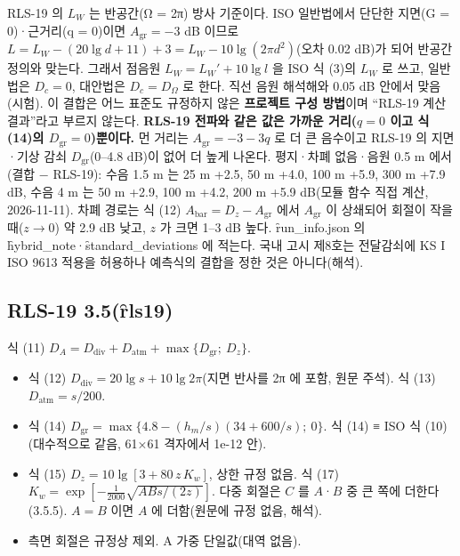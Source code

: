 \documentclass[10.5pt,a4paper]{article}
\begin{document}
 RLS-19 의 $L_W$ 는 반공간(Ω = 2π) 방사 기준이다. ISO 일반법에서 단단한 지면(G = 0)·근거리(q = 0)이면 $A_\mathrm{gr} = -3$ dB 이므로 $L = L_W - (20\lg d + 11) + 3 = L_W - 10\lg(2\pi d^2)$(오차 0.02 dB)가 되어 반공간 정의와 맞는다. 그래서 점음원 $L_W = L_W' + 10\lg l$ 을 ISO 식 (3)의 $L_W$ 로 쓰고, 일반법은 $D_c = 0$, 대안법은 $D_c = D_\Omega$ 로 한다. 직선 음원 해석해와 0.05 dB 안에서 맞음(시험). 이 결합은 어느 표준도 규정하지 않은 \textbf{프로젝트 구성 방법}이며 ``RLS-19 계산 결과''라고 부르지 않는다. \textbf{RLS-19 전파와 같은 값은 가까운 거리($q = 0$ 이고 식 (14)의 $D_\mathrm{gr} = 0$)뿐이다.} 먼 거리는 $A_\mathrm{gr} = -3 - 3q$ 로 더 큰 음수이고 RLS-19 의 지면·기상 감쇠 $D_\mathrm{gr}$(0–4.8 dB)이 없어 더 높게 나온다. 평지·차폐 없음·음원 0.5 m 에서 (결합 − RLS-19): 수음 1.5 m 는 25 m +2.5, 50 m +4.0, 100 m +5.9, 300 m +7.9 dB, 수음 4 m 는 50 m +2.9, 100 m +4.2, 200 m +5.9 dB(모듈 함수 직접 계산, 2026-11-11). 차폐 경로는 식 (12) $A_\mathrm{bar} = D_z - A_\mathrm{gr}$ 에서 $A_\mathrm{gr}$ 이 상쇄되어 회절이 작을 때($z \to 0$) 약 2.9 dB 낮고, $z$ 가 크면 1–3 dB 높다. \f{run\_info.json} 의 \f{hybrid\_note}·\f{standard\_deviations} 에 적는다. 국내 고시 제8호는 전달감쇠에 KS I ISO 9613 적용을 허용하나 예측식의 결합을 정한 것은 아니다(해석).

\subsection{RLS-19 3.5(\f{rls19})}
식 (11) $D_A = D_\mathrm{div} + D_\mathrm{atm} + \max\{D_\mathrm{gr};\ D_z\}$.
\begin{itemize}
\item 식 (12) $D_\mathrm{div} = 20\lg s + 10\lg 2\pi$(지면 반사를 2π 에 포함, 원문 주석). 식 (13) $D_\mathrm{atm} = s/200$.
\item 식 (14) $D_\mathrm{gr} = \max\{4.8 - (h_m/s)(34 + 600/s);\ 0\}$. 식 (14) ≡ ISO 식 (10)(대수적으로 같음, 61×61 격자에서 1e-12 안).
\item 식 (15) $D_z = 10\lg[3 + 80\,z\,K_w]$, 상한 규정 없음. 식 (17) $K_w = \exp[-\frac{1}{2000}\sqrt{ABs/(2z)}]$. 다중 회절은 $C$ 를 $A$·$B$ 중 큰 쪽에 더한다(3.5.5). $A = B$ 이면 $A$ 에 더함(원문에 규정 없음, 해석).
\item 측면 회절은 규정상 제외. A 가중 단일값(대역 없음).
\end{itemize}
\end{document}
